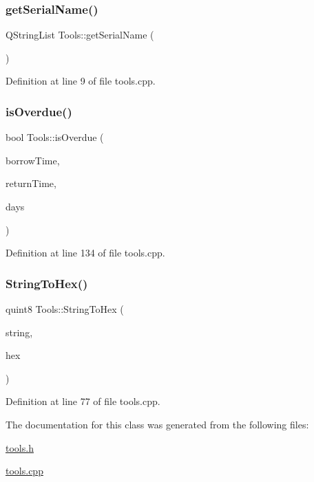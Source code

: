 \subsubsection{\texorpdfstring{getSerialName()}{getSerialName()}}
{\footnotesize\ttfamily Q\+String\+List Tools\+::get\+Serial\+Name (\begin{DoxyParamCaption}{ }\end{DoxyParamCaption})}



Definition at line 9 of file tools.\+cpp.

\mbox{\label{class_tools_a178182aebac5d407b60720335c04822a}} 
\subsubsection{\texorpdfstring{isOverdue()}{isOverdue()}}
{\footnotesize\ttfamily bool Tools\+::is\+Overdue (\begin{DoxyParamCaption}\item[{Q\+String}]{borrow\+Time,  }\item[{Q\+String}]{return\+Time,  }\item[{int}]{days }\end{DoxyParamCaption})}



Definition at line 134 of file tools.\+cpp.

\mbox{\label{class_tools_a724c823ede8cd11880888f64b1a3c4df}} 
\subsubsection{\texorpdfstring{StringToHex()}{StringToHex()}}
{\footnotesize\ttfamily quint8 Tools\+::\+String\+To\+Hex (\begin{DoxyParamCaption}\item[{Q\+String}]{string,  }\item[{quint8 $\ast$}]{hex }\end{DoxyParamCaption})}



Definition at line 77 of file tools.\+cpp.



The documentation for this class was generated from the following files\+:\begin{DoxyCompactItemize}
\item 
\mbox{\hyperlink{tools_8h}{tools.\+h}}\item 
\mbox{\hyperlink{tools_8cpp}{tools.\+cpp}}\end{DoxyCompactItemize}
